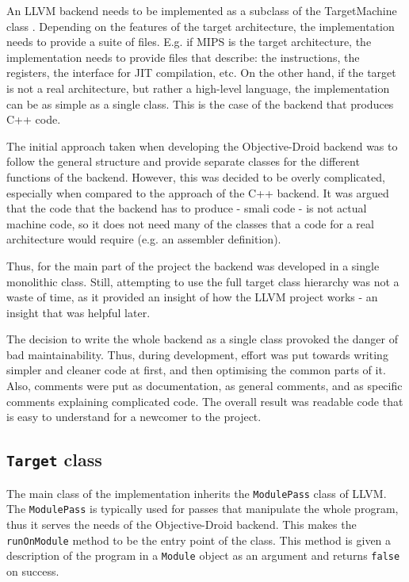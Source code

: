 \documentclass[parskip]{cs4rep}
\begin{document}
An LLVM backend needs to be implemented as a subclass of the TargetMachine class \cite{P8}. Depending on the features of the target architecture, the implementation needs to provide a suite of files. E.g. if MIPS is the target architecture, the implementation needs to provide files that describe: the instructions, the registers, the interface for JIT compilation, etc. On the other hand, if the target is not a real architecture, but rather a high-level language, the implementation can be as simple as a single class. This is the case of the backend that produces C++ code.

The initial approach taken when developing the Objective-Droid backend was to follow the general structure and provide separate classes for the different functions of the backend. However, this was decided to be overly complicated, especially when compared to the approach of the C++ backend. It was argued that the code that the backend has to produce - smali code - is not actual machine code, so it does not need many of the classes that a code for a real architecture would require (e.g. an assembler definition).

Thus, for the main part of the project the backend was developed in a single monolithic class. Still, attempting to use the full target class hierarchy was not a waste of time, as it provided an insight of how the LLVM project works - an insight that was helpful later.

The decision to write the whole backend as a single class provoked the danger of bad maintainability. Thus, during development, effort was put towards writing simpler and cleaner code at first, and then optimising the common parts of it. Also, comments were put as documentation, as general comments, and as specific comments explaining complicated code. The overall result was readable code that is easy to understand for a newcomer to the project.

\subsection{{\tt Target} class}

The main class of the implementation inherits the {\tt ModulePass} class of LLVM. The {\tt ModulePass} is typically used for passes that manipulate the whole program, thus it serves the needs of the Objective-Droid backend. This makes the {\tt runOnModule} method to be the entry point of the class. This method is given a description of the program in a {\tt Module} object as an argument and returns {\tt false} on success.
\end{document}
